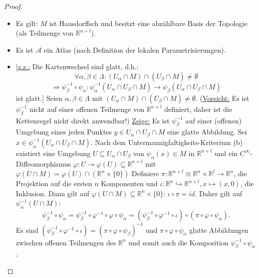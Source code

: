 \documentclass[a4paper,11pt,notitlepage]{report}
\newcommand{\R}{{\ensuremath{\mathbb{R}}}}
\begin{document}
\begin{proof}
	\begin{itemize}
		\item Es gilt: $M$ ist Hausdorffsch und besitzt eine abzählbare Basis der Topologie (als Teilmenge von $\R^{n+l}$).
		\item Es ist $\mathcal{A}$ ein Atlas (nach Definition der lokalen Parametrisierungen).
		\item $[$\underline{z.z.:} Die Kartenwechsel sind glatt, d.h.: 
			$$\forall \alpha, \beta \in \Lambda \colon (U_\alpha \cap M) \cap (U_\beta \cap M) \neq \emptyset$$
			$$\Rightarrow \psi_\beta^{-1} \circ \psi_\alpha \colon \psi_\alpha^{-1}(U_\alpha \cap U_\beta \cap M) \rightarrow \psi_\beta(U_\alpha \cap U_\beta \cap M)$$
			 ist glatt.$]$ \newline
			Seien $\alpha, \beta \in \Lambda$ mit $(U_\alpha \cap M) \cap (U_\beta \cap M) \neq \emptyset$.
			\newline
			(\underline{Vorsicht:} Es ist $\psi_\beta^{-1}$ nicht auf einer offenen Teilmenge von $\R^{n+l}$ definiert, daher ist die Kettenregel nicht direkt anwendbar!)
			\newline
			\underline{Zeige:} Es ist $\psi_\beta^{-1}$ auf einer (offenen) Umgebung eines jeden Punktes $y \in U_\alpha \cap U_\beta \cap M$ eine glatte Abbildung.
			\newline
			Sei $x \in \psi_\alpha^{-1}(U_\alpha \cap U_\beta \cap M)$. Nach dem Untermannigfaltigkeits-Kriterium (b) existiert eine Umgebung $U \subseteq U_\alpha \cap U_\beta$ von $\psi_\alpha(x) \in M$ in $\R^{n+l}$ und ein $C^\infty$-Diffeomorphismus $\varphi \colon U \rightarrow \varphi(U) \subseteq \R^{n+l}$ mit $\varphi(U \cap M) = \varphi(U) \cap (\R^{n} \times \{0\})$
			\newline
			Definiere $\pi \colon \R^{n+l} \cong \R^n \times \R^l \rightarrow \R^n$, die Projektion auf die ersten $n$ Komponenten und $\iota \colon \R^n \hookrightarrow \R^{n+l}, x \mapsto (x,0)$, die Inklusion. Dann gilt auf $\varphi(U \cap M) \subseteq \R^{n} \times \{0\}$: $\iota \circ \pi = id$. Daher gilt auf $\psi_\alpha^{-1}(U \cap M)$: 
			$$\psi_\beta^{-1} \circ \psi_\alpha = \psi_\beta^{-1} \circ \varphi^{-1} \circ \varphi \circ \psi_\alpha = (\psi_\beta^{-1} \circ \varphi^{-1} \circ \iota)\circ(\pi \circ \varphi \circ \psi_\alpha).$$
			Es sind $(\psi_\beta^{-1} \circ \varphi^{-1} \circ \iota) = (\pi \circ \varphi \circ \psi_\beta)^{-1}$ und $\pi \circ \varphi \circ \psi_\alpha$ glatte Abbildungen zwischen offenen Teilmengen des $\R^n$ und somit auch die Komposition $\psi_\beta^{-1} \circ \psi_\alpha$.
	\end{itemize}
\end{proof}
\end{document}
